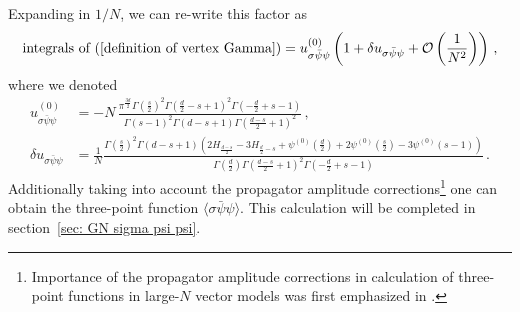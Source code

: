 \documentclass[aps,amsmath,amssymb,prd,showpacs,floatfix,preprint,superscriptaddress,nofootinbib,12pt]{article}
\begin{document}
Expanding in $1/N$, we can re-write this factor as
\begin{equation}
\label{integral over vertices of conf triangle}
\textrm{integrals of }(\ref{definition of vertex Gamma})=u_{\sigma\bar\psi\psi}^{(0)}\left(1+\delta u_{\sigma\bar\psi\psi}
+{\cal O}\left(\frac{1}{N^2}\right)\right)\,,
\end{equation}
where we denoted
\begin{align}
u_{\sigma\bar\psi\psi}^{(0)}&{=}-N\,\frac{\pi ^{\frac{3 d}{2}} \Gamma \left(\frac{s}{2}\right)^2 \Gamma \left(\frac{d}{2}{-}s{+}1\right)^2 \Gamma \left({-}\frac{d}{2}{+}s{-}1\right)}{\Gamma (s{-}1)^2 \Gamma (d{-}s{+}1) \Gamma \left(\frac{d{-}s}{2} {+}1\right)^2}\,,\\
\delta u_{\sigma\bar\psi\psi}&{=}\frac{1}{N}\frac{\Gamma \left(\frac{s}{2}\right)^2 \Gamma (d{-}s{+}1) \left(2 H_{\frac{d-s}{2}}{-}3 H_{\frac{d}{2}{-}s}+\psi ^{(0)}\left(\frac{d}{2}\right){+}2 \psi ^{(0)}\left(\frac{s}{2}\right){-}3 \psi ^{(0)}(s{-}1)\right)}{ \Gamma \left(\frac{d}{2}\right) \Gamma \left(\frac{d{-}s}{2} {+}1\right)^2 \Gamma \left({-}\frac{d}{2}{+}s{-}1\right)}\,.
\end{align}
Additionally taking into account the propagator amplitude corrections\footnote{
Importance of the propagator amplitude corrections in calculation of three-point functions
in large-$N$ vector models was first emphasized in \cite{Goykhman:2019kcj}.}
one can obtain the three-point
function $\langle\sigma\bar\psi\psi\rangle$. This calculation will be completed in section~\ref{sec: GN sigma psi psi}.
\end{document}

